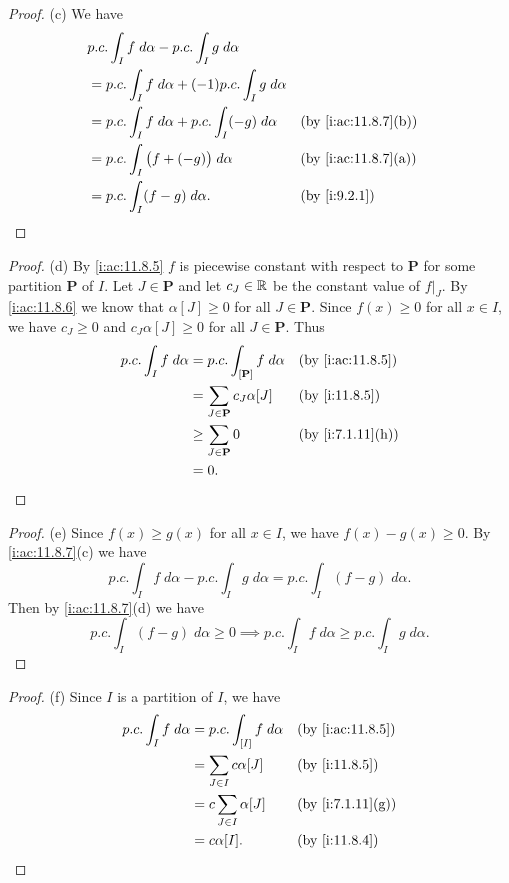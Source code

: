 \begin{proof}{(c)}
  We have
  \begin{align*}
     & p.c. \int_I f \; d \alpha - p.c. \int_I g \; d \alpha                                 \\
     & = p.c. \int_I f \; d \alpha + (-1) p.c. \int_I g \; d \alpha                          \\
     & = p.c. \int_I f \; d \alpha + p.c. \int_I (-g) \; d \alpha   &  & \by{i:ac:11.8.7}[b] \\
     & = p.c. \int_I \big(f + (-g)\big) \; d \alpha                 &  & \by{i:ac:11.8.7}[a] \\
     & = p.c. \int_I (f - g) \; d \alpha.                           &  & \by{i:9.2.1}
  \end{align*}
\end{proof}

\begin{proof}{(d)}
  By \cref{i:ac:11.8.5} \(f\) is piecewise constant with respect to \(\mathbf{P}\) for some partition \(\mathbf{P}\) of \(I\).
  Let \(J \in \mathbf{P}\) and let \(c_J \in \mathbb{R}\) be the constant value of \(f|_J\).
  By \cref{i:ac:11.8.6} we know that \(\alpha[J] \geq 0\) for all \(J \in \mathbf{P}\).
  Since \(f(x) \geq 0\) for all \(x \in I\), we have \(c_J \geq 0\) and \(c_J \alpha[J] \geq 0\) for all \(J \in \mathbf{P}\).
  Thus
  \begin{align*}
    p.c. \int_I f \; d \alpha & = p.c. \int_{[\mathbf{P}]} f \; d \alpha &  & \by{i:ac:11.8.5} \\
                              & = \sum_{J \in \mathbf{P}} c_J \alpha[J]  &  & \by{i:11.8.5}    \\
                              & \geq \sum_{J \in \mathbf{P}} 0           &  & \by{i:7.1.11}[h] \\
                              & = 0.
  \end{align*}
\end{proof}

\begin{proof}{(e)}
  Since \(f(x) \geq g(x)\) for all \(x \in I\), we have \(f(x) - g(x) \geq 0\).
  By \cref{i:ac:11.8.7}(c) we have
  \[
    p.c. \int_I f \; d \alpha - p.c. \int_I g \; d \alpha = p.c. \int_I (f - g) \; d \alpha.
  \]
  Then by \cref{i:ac:11.8.7}(d) we have
  \[
    p.c. \int_I (f - g) \; d \alpha \geq 0 \implies p.c. \int_I f \; d \alpha \geq p.c. \int_I g \; d \alpha.
  \]
\end{proof}

\begin{proof}{(f)}
  Since \(I\) is a partition of \(I\), we have
  \begin{align*}
    p.c. \int_I f \; d \alpha & = p.c. \int_{[I]} f \; d \alpha &  & \by{i:ac:11.8.5} \\
                              & = \sum_{J \in I} c \alpha[J]    &  & \by{i:11.8.5}    \\
                              & = c \sum_{J \in I} \alpha[J]    &  & \by{i:7.1.11}[g] \\
                              & = c \alpha[I].                  &  & \by{i:11.8.4}
  \end{align*}
\end{proof}

